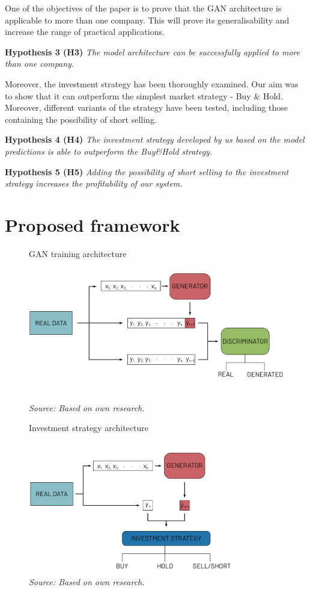 \documentclass[11pt]{article} %
\begin{document}
One of the objectives of the paper is to prove that the GAN architecture is applicable to more than one company. This will prove its generalisability and increase the range of practical applications.

\textbf{Hypothesis 3 (H3)} \textit{The model architecture can be successfully applied to more than one company.}

Moreover, the investment strategy has been thoroughly examined. Our aim was to show that it can outperform the simplest market strategy - Buy \& Hold. Moreover, different variants of the strategy have been tested, including those containing the possibility of short selling. 

\textbf{Hypothesis 4 (H4)} \textit{The investment strategy developed by us based on the model predictions is able to outperform the Buy\&Hold strategy.} 

\textbf{Hypothesis 5 (H5)} \textit{Adding the possibility of short selling to the investment strategy increases the profitability of our system.}


\section{Proposed framework}

\begin{figure}[H]
\caption{GAN training architecture}
\includegraphics{rysunek1.png}
\caption*{\textit{Source: Based on own research.}}
\end{figure}

\begin{figure}[H]
\caption{Investment strategy architecture}
\includegraphics{rysunek2.png}
\caption*{\textit{Source: Based on own research.}}
\end{figure}
\end{document}
